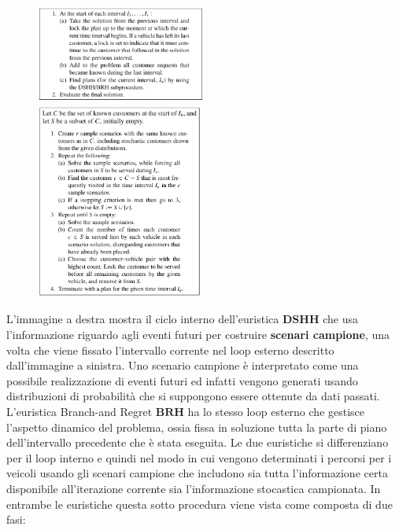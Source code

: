 \documentclass[
]{article}
\begin{document}
\begin{figure}
    \centering
    \includegraphics[width=0.5\textwidth,height=\textheight]{Images/OuterLoopBRH.png}
\includegraphics[width=0.49\textwidth,height=\textheight]{Images/InnerLoopDDSH.png}
\end{figure}



L'immagine a destra mostra il ciclo interno dell'euristica
{\(\mathbf{DSHH}\)} che usa l'informazione riguardo agli eventi futuri
per costruire \textbf{scenari campione}, una volta che viene fissato
l'intervallo corrente nel loop esterno descritto dall'immagine a
sinistra. Uno scenario campione è interpretato come una possibile
realizzazione di eventi futuri ed infatti vengono generati usando
distribuzioni di probabilità che si suppongono essere ottenute da dati
passati. L'euristica Branch-and Regret {\(\mathbf{BRH}\)} ha lo stesso
loop esterno che gestisce l'aspetto dinamico del problema, ossia fissa
in soluzione tutta la parte di piano dell'intervallo precedente che è
stata eseguita. Le due euristiche si differenziano per il loop interno e
quindi nel modo in cui vengono determinati i percorsi per i veicoli
usando gli scenari campione che includono sia tutta l'informazione certa
disponibile all'iterazione corrente sia l'informazione stocastica
campionata. In entrambe le euristiche questa sotto procedura viene vista
come composta di due fasi:
\end{document}
